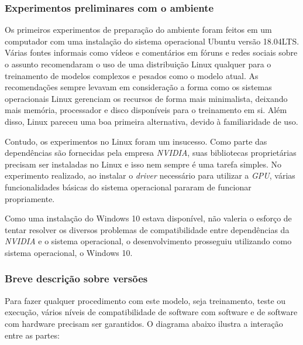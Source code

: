 \subsubsection{Experimentos preliminares com o ambiente}

Os primeiros experimentos de preparação do ambiente foram feitos em um computador com uma instalação do sistema operacional Ubuntu versão 18.04LTS. Várias fontes informais como vídeos e comentários em fóruns e redes sociais sobre o assunto recomendaram o uso de uma distribuição Linux qualquer para o treinamento de modelos complexos e pesados como o modelo atual. As recomendações sempre levavam em consideração a forma como os sistemas operacionais Linux gerenciam os recursos de forma mais minimalista, deixando mais memória, processador e disco disponíveis para o treinamento em si. Além disso, Linux pareceu uma boa primeira alternativa, devido à familiaridade de uso.

Contudo, os experimentos no Linux foram um insucesso. Como parte das dependências são fornecidas pela empresa \textit{NVIDIA}, suas bibliotecas proprietárias precisam ser instaladas no Linux e isso nem sempre é uma tarefa simples. No experimento realizado, ao instalar o \textit{driver} necessário para utilizar a \textit{GPU}, várias funcionalidades básicas do sistema operacional pararam de funcionar propriamente.

Como uma instalação do Windows 10 estava disponível, não valeria o esforço de tentar resolver os diversos problemas de compatibilidade entre dependências da \textit{NVIDIA} e o sistema operacional, o desenvolvimento prosseguiu utilizando como sistema operacional, o Windows 10.

\subsubsection{Breve descrição sobre versões}

Para fazer qualquer procedimento com este modelo, seja treinamento, teste ou execução, vários níveis de compatibilidade de software com software e de software com hardware precisam ser garantidos. O diagrama abaixo ilustra a interação entre as partes:


